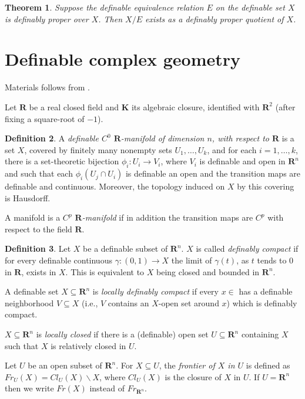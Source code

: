 \documentclass{amsart}
\newtheorem{theorem}{Theorem}[subsection]
\theoremstyle{definition}
\newtheorem{definition}[theorem]{Definition}
\numberwithin{equation}{section}
\begin{document}
\begin{theorem}
    Suppose the definable equivalence relation $E$ on the definable set $X$ is definably proper over $X$.
    Then $X/E$ exists as a definably proper quotient of $X$.
\end{theorem}

\section{Definable complex geometry}
Materials follows from \cite{MR2441378}.

Let $\mathbf{R}$ be a real closed field and $\mathbf{K}$ its algebraic closure,
identified with $\mathbf{R}^2$ (after fixing a square-root of $-1$).

\begin{definition}
    A \emph{definable $C^0$ $\mathbf{R}$-manifold of dimension $n$, with respect to $\mathbf{R}$} is a set $X$,
    covered by finitely many nonempty sets $U_1, \dots, U_k$,
    and for each $i = 1, \dots, k$,
    there is a set-theoretic bijection $\phi_i:U_i \to V_i$,
    where $V_i$ is definable and open in $\mathbf{R}^n$ and such that each $\phi_i(U_j\cap U_i)$ is definable  an open and the transition maps are definable and continuous.
    Moreover, the topology induced on $X$ by this covering is Hausdorff.

    A manifold is a \emph{$C^p$ $\mathbf{R}$-manifold} if in addition
    the transition maps are $C^p$ with respect to the field $\mathbf{R}$.
\end{definition}

\begin{definition}
    Let $X$ be a definable subset of $\mathbf{R}^n$.
    $X$ is called \emph{definably compact} if for every definable continuous $\gamma:(0,1) \to X$ the limit of $\gamma(t)$,
    as $t$ tends to $0$ in $\mathbf{R}$, exists in $X$.
    This is equivalent to $X$ being closed and bounded in $\mathbf{R}^n$.

    A definable set $X \subseteq \mathbf{R}^n$ is \emph{locally definably compact} if every $x \in $ has a definable neighborhood $V\subseteq X$
    (i.e., $V$ contains an $X$-open set around $x$)
    which is definably compact.

    $X \subseteq \mathbf{R}^n$ is \emph{locally closed} if there is a (definable) open set $U \subseteq \mathbf{R}^n$ containing $X$
    such that $X$ is relatively closed in $U$.

    Let $U$ be an open subset of $\mathbf{R}^n$.
    For $X \subseteq U$, 
    the \emph{frontier of $X$ in $U$} is defined as $Fr_U(X) = Cl_U(X)\backslash X$,
    where $Cl_U(X)$ is the closure of $X$ in $U$.
    If $U = \mathbf{R}^n$ then we write $Fr(X)$ instead of $Fr_{\mathbf{R}^n}$.  
\end{definition}
\end{document}
